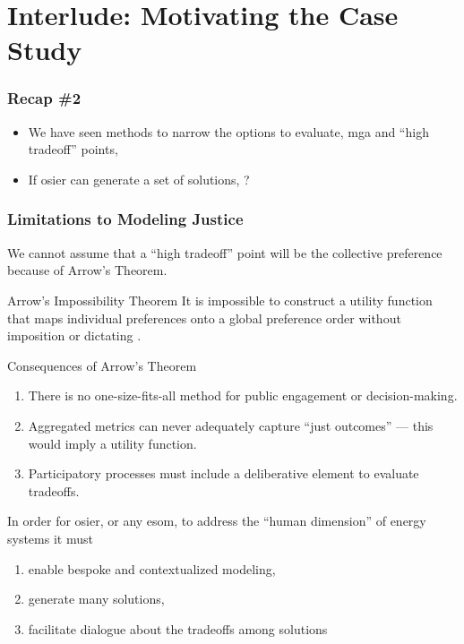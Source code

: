 \section{Interlude: Motivating the Case Study}

\begin{frame}
    \frametitle{Recap \#2}
    \begin{itemize}
        \item We have seen methods to narrow the options to evaluate, \gls{mga} and ``high tradeoff'' points, 
        \item If \gls{osier} can generate a set of solutions, ?
    \end{itemize}
\end{frame}

\begin{frame}
    \frametitle{Limitations to Modeling Justice}
    We cannot assume that a ``high tradeoff'' point will be the collective preference because of Arrow's Theorem.
    \pause
    \begin{block}{Arrow's Impossibility Theorem}
        It is impossible to construct a utility function
        that maps individual preferences onto a global preference
        order without imposition or dictating \cite{arrow_difficulty_1950,franssen_arrows_2005}.
    \end{block}
    \pause
    \begin{block}{Consequences of Arrow's Theorem}
        \begin{enumerate}[<+->]
            \item There is no one-size-fits-all method for public engagement or
            decision-making.
            \item Aggregated metrics can never adequately capture ``just outcomes'' ---
            this would imply a utility function.
            \item Participatory processes must include a deliberative element to evaluate
            tradeoffs.
        \end{enumerate}
    \end{block}
\end{frame}

\begin{frame}
    
    In order for \gls{osier}, or any \gls{esom}, to address the ``human dimension'' of energy systems it must
    \begin{enumerate}[<+->]
        \item enable bespoke and contextualized modeling,
        \item generate many solutions,
        \item facilitate dialogue about the tradeoffs among solutions
    \end{enumerate}

\end{frame}

